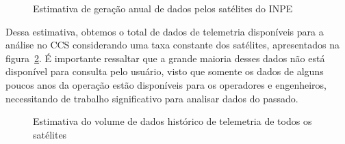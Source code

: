 \begin{figure}[!htb]
	\caption{Estimativa de geração anual de dados pelos satélites do INPE}\label{fig:datagenest}
	\vspace{4mm}
	\begin{center}
	\end{center}
	\vspace{2mm}
\end{figure}

Dessa estimativa, obtemos o total de dados de telemetria disponíveis para a análise no CCS considerando uma taxa constante dos satélites, apresentados na figura~\ref{fig:totaldatagen}.
É importante ressaltar que a grande maioria desses dados não está disponível para consulta pelo usuário, visto que somente os dados de alguns poucos anos da operação estão disponíveis para os operadores e engenheiros, necessitando de trabalho significativo para analisar dados do passado.

\begin{figure}[!hb]
	\caption{Estimativa do volume de dados histórico de telemetria de todos os satélites}\label{fig:totaldatagen}
	\vspace{4mm}
	\begin{center}
	\end{center}
	\vspace{2mm}
\end{figure}

